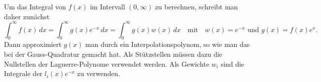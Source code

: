 Um das Integral von $f(x)$ im Intervall $(0,\infty)$ zu berechnen,
schreibt man daher zunächst
\[
\int_0^\infty f(x)\,dx
=
\int_0^\infty g(x)e^{-x}\,dx
=
\int_0^\infty g(x) w(x)\,dx
\quad\text{mit}\quad
w(x)=e^{-x}
\text{ und }
g(x)=f(x)e^x.
\]
Dann approximiert $g(x)$ man durch ein Interpolationspolynom,
so wie man das bei der Gauss-Quadratur gemacht hat.
Als Stützstellen müssen dazu die Nullstellen der Laguerre-Polynome
verwendet werden.
Als Gewichte $w_i$ sind die Integrale der $l_i(x)e^{-x}$
zu verwenden.





